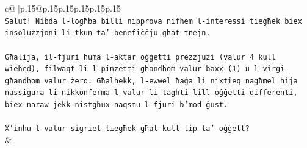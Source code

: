 \documentclass{article}
\begin{document}
{\begin{supertabular}{c@{$\;$}|p{.15\linewidth}@{}p{.15\linewidth}p{.15\linewidth}p{.15\linewidth}p{.15\linewidth}p{.15\linewidth}}
{{{\\ 
\texttt{Salut! Nibda l{-}logħba billi nipprova nifhem l{-}interessi tiegħek biex insoluzzjoni li tkun ta' benefiċċju għat{-}tnejn.} \\
\\ 
\texttt{Għalija, il{-}fjuri huma l{-}aktar oġġetti prezzjużi (valur 4 kull wieħed), filwaqt li l{-}pinzetti għandhom valur baxx (1) u l{-}virgi għandhom valur żero. Għalhekk, l{-}ewwel ħaġa li nixtieq nagħmel hija nassigura li nikkonferma l{-}valur li tagħti lill{-}oġġetti differenti, biex naraw jekk nistgħux naqsmu l{-}fjuri b'mod ġust.} \\
\\ 
\texttt{X'inhu l{-}valur sigriet tiegħek għal kull tip ta' oġġett?} \\
            }
        }
    }
    & \\ \\


\end{supertabular}}
\end{document}
